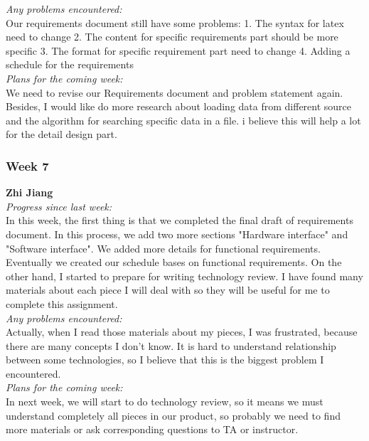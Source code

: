 \noindent\textit{Any problems encountered:}\\
Our requirements document still have some problems: 1. The syntax for latex need to change 2. The content for specific requirements part should be more specific 3. The format for specific requirement part need to change 4. Adding a schedule for the requirements\\

\noindent\textit{Plans for the coming week:}\\
We need to revise our Requirements document and problem statement again. Besides, I would like do more research about loading data from different source and the algorithm for searching specific data in a file. i believe this will help a lot for the detail design part.\\

\subsubsection{Week 7}

\textbf{Zhi Jiang}\\
\noindent\textit{Progress since last week:}\\
In this week, the first thing is that we completed the final draft of requirements document. In this process, we add two more sections "Hardware interface" and "Software interface". We added more details for functional requirements. Eventually we created our schedule bases on functional requirements. On the other hand, I started to prepare for writing technology review. I have found many materials about each piece I will deal with so they will be useful for me to complete this assignment.\\

\noindent\textit{Any problems encountered:}\\
Actually, when I read those materials about my pieces, I was frustrated, because there are many concepts I don't know. It is hard to understand relationship between some technologies, so I believe that this is the biggest problem I encountered.\\

\noindent\textit{Plans for the coming week:}\\
In next week, we will start to do technology review, so it means we must understand completely all pieces in our product, so probably we need to find more materials or ask corresponding questions to TA or instructor.\\


